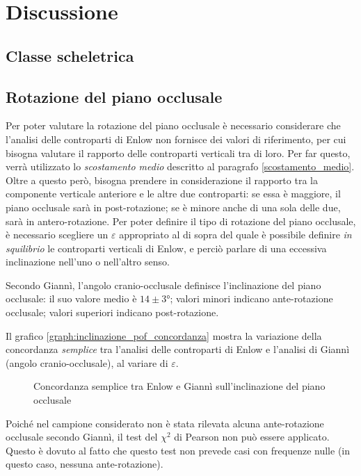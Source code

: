 \chapter{Discussione}

\section{Classe scheletrica}

\section{Rotazione del piano occlusale}
Per poter valutare la rotazione del piano occlusale è necessario considerare che l'analisi delle controparti di Enlow non fornisce dei valori di riferimento, per cui bisogna valutare il rapporto delle controparti verticali tra di loro. Per far questo, verrà utilizzato lo \emph{scostamento medio} descritto al paragrafo \vref{scostamento_medio}. Oltre a questo però, bisogna prendere in considerazione il rapporto tra la componente verticale anteriore e le altre due controparti: se essa è maggiore, il piano occlusale sarà in post-rotazione; se è minore anche di una sola delle due, sarà in antero-rotazione. Per poter definire il tipo di rotazione del piano occlusale, è necessario scegliere un $\varepsilon$ appropriato al di sopra del quale è possibile definire \emph{in squilibrio} le controparti verticali di Enlow, e perciò parlare di una eccessiva inclinazione nell'uno o nell'altro senso.

Secondo Giannì, l'angolo cranio-occlusale definisce l'inclinazione del piano occlusale: il suo valore medio è $14 \pm 3°$; valori minori indicano ante-rotazione occlusale; valori superiori indicano post-rotazione.

Il grafico \vref{graph:inclinazione_pof_concordanza} mostra la variazione della concordanza \emph{semplice} tra l'analisi delle controparti di Enlow e l'analisi di Giannì (angolo cranio-occlusale), al variare di $\varepsilon$.

\begin{figure}[ht!]
\centering

\caption{Concordanza semplice tra Enlow e Giannì sull'inclinazione del piano occlusale}
\label{graph:inclinazione_pof_concordanza}
\end{figure}

Poiché nel campione considerato non è stata rilevata alcuna ante-rotazione occlusale secondo Giannì, il test del $\chi^2$ di Pearson non può essere applicato. Questo è dovuto al fatto che questo test non prevede casi con frequenze nulle (in questo caso, nessuna ante-rotazione).

